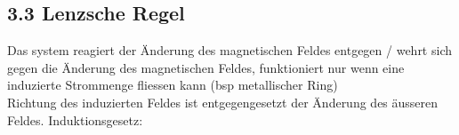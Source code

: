 \subsection{3.3 Lenzsche Regel}
    Das system reagiert der Änderung des magnetischen Feldes entgegen / wehrt sich gegen die Änderung des magnetischen Feldes, funktioniert nur wenn eine induzierte Strommenge fliessen kann (bsp metallischer Ring)\\
    Richtung des induzierten Feldes ist entgegengesetzt der Änderung des äusseren Feldes.
    Induktionsgesetz:
